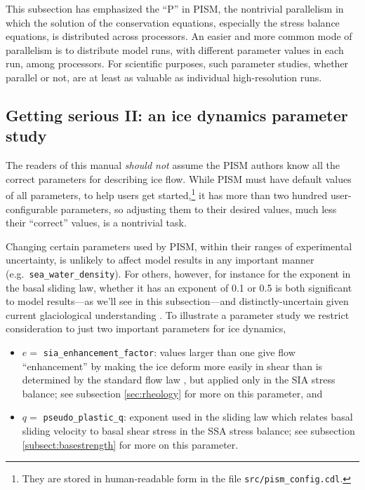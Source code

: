 This subsection has emphasized the ``P'' in PISM, the nontrivial parallelism in which the solution of the conservation equations, especially the stress balance equations, is distributed across processors.  An easier and more common mode of parallelism is to distribute model runs, with different parameter values in each run, among processors.  For scientific purposes, such parameter studies, whether parallel or not, are at least as valuable as individual high-resolution runs.


\subsection{Getting serious II: an ice dynamics parameter study}  \label{subsect:paramstudy}

The readers of this manual \emph{should not} assume the PISM authors know all the correct parameters for describing ice flow.  While PISM must have default values of all parameters, to help users get started,\footnote{They are stored in human-readable form in the file \texttt{src/pism_config.cdl}.} it has more than two hundred user-configurable parameters, so adjusting them to their desired values, much less their ``correct'' values, is a nontrivial task.

Changing certain parameters used by PISM, within their ranges of experimental uncertainty, is unlikely to affect model results in any important manner (e.g.~\texttt{sea_water_density}).  For others, however, for instance for the exponent in the basal sliding law, whether it has an exponent of 0.1 or 0.5 is both significant to model results---as we'll see in this subsection---and distinctly-uncertain given current glaciological understanding \cite{CuffeyPaterson}.  To illustrate a parameter study we restrict consideration to just two important parameters for ice dynamics,\begin{itemize}
\item $e=$ \texttt{sia_enhancement_factor}: values larger than one give flow ``enhancement'' by making the ice deform more easily in shear than is determined by the standard flow law \cite{LliboutryDuval1985,PatersonBudd}, but applied only in the SIA stress balance; see subsection \ref{sec:rheology} for more on this parameter, and
\item $q=$ \texttt{pseudo_plastic_q}: exponent used in the sliding law which relates basal sliding velocity to basal shear stress in the SSA stress balance; see subsection \ref{subsect:basestrength} for more on this parameter.
\end{itemize}


